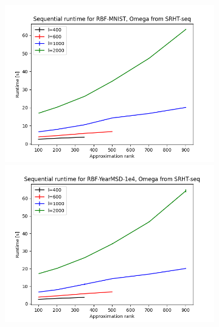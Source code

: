 \documentclass{article}
\theoremstyle{definition}
\begin{document}
\begin{figure}
\centering
\hfill\begin{subfigure}[t]{\textwidth+20pt\relax}
    \includegraphics[width=\dimexpr\linewidth-20pt\relax]
        {../plots/runtime_new/runtime_RBF-MNIST_SRHT-seq.png}
    \includegraphics[width=\dimexpr\linewidth-20pt\relax]
        {../plots/runtime_new/runtime_RBF-YearMSD-1e4_SRHT-seq.png}

\end{subfigure}
\end{figure}
\end{document}
